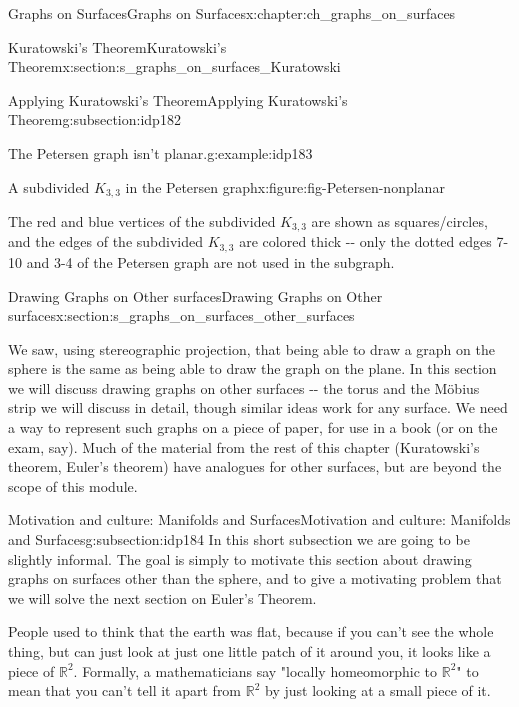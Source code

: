 \documentclass[oneside,10pt,]{book}
\numberwithin{equation}{section}
\newcommand{\reals}{\mathbb{R}}
\begin{document}
\begin{chapterptx}{Graphs on Surfaces}{}{Graphs on Surfaces}{}{}{x:chapter:ch_graphs_on_surfaces}
\begin{sectionptx}{Kuratowski's Theorem}{}{Kuratowski's Theorem}{}{}{x:section:s_graphs_on_surfaces_Kuratowski}
\begin{subsectionptx}{Applying Kuratowski's Theorem}{}{Applying Kuratowski's Theorem}{}{}{g:subsection:idp182}
\begin{example}{The Petersen graph isn't planar.}{g:example:idp183}
\begin{figureptx}{A subdivided \(K_{3,3}\) in the Petersen graph}{x:figure:fig-Petersen-nonplanar}{}
\begin{image}{0.05}{0.9}{0.05}
{\begin{tikzpicture}
\end{tikzpicture}
}%
\end{image}%
\tcblower
\end{figureptx}%
The red and blue vertices of the subdivided \(K_{3,3}\) are shown as squares\slash{}circles, and the edges of the subdivided \(K_{3,3}\) are colored thick -{}-{} only the dotted edges 7-10 and 3-4 of the Petersen graph are not used in the subgraph.%
\end{example}
\end{subsectionptx}
\end{sectionptx}
%
%
\typeout{************************************************}
\typeout{************************************************}
%
\begin{sectionptx}{Drawing Graphs on Other surfaces}{}{Drawing Graphs on Other surfaces}{}{}{x:section:s_graphs_on_surfaces_other_surfaces}
\begin{introduction}{}%
We saw, using stereographic projection, that being able to draw a graph on the sphere is the same as being able to draw the graph on the plane.  In this section we will discuss drawing graphs on other surfaces -{}-{} the torus and the Möbius strip we will discuss in detail, though similar ideas work for any surface.  We need a way to represent such graphs on a piece of paper, for use in a book (or on the exam, say).  Much of the material from the rest of this chapter (Kuratowski's theorem, Euler's theorem) have analogues for other surfaces, but are beyond the scope of this module.%
\end{introduction}%
%
%
\typeout{************************************************}
\typeout{************************************************}
%
\begin{subsectionptx}{Motivation and culture: Manifolds and Surfaces}{}{Motivation and culture: Manifolds and Surfaces}{}{}{g:subsection:idp184}
In this short subsection we are going to be slightly informal.  The goal is simply to motivate this section about drawing graphs on surfaces other than the sphere, and to give a motivating problem that we will solve the next section on Euler's Theorem.%
\par
People used to think that the earth was flat, because if you can't see the whole thing, but can just look at just one little patch of it around you, it looks like a piece of \(\reals^2\).  Formally, a mathematicians say "locally homeomorphic to \(\reals^2\)" to mean that you can't tell it apart from \(\reals^2\) by just looking at a small piece of it.%

\end{subsectionptx}
\end{sectionptx}
\end{chapterptx}
\end{document}

